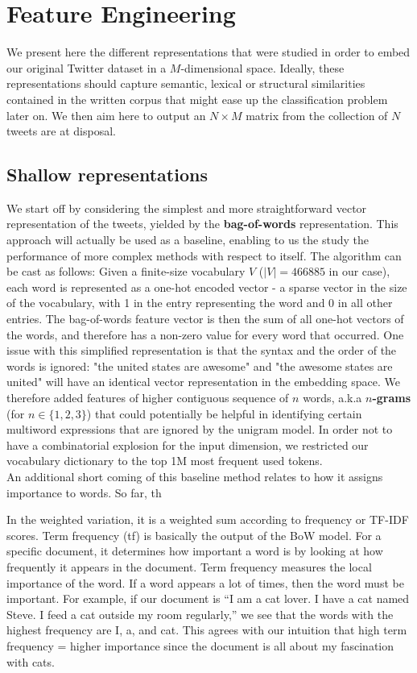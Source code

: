 \documentclass[10pt,conference,compsocconf,retainorgcmds]{IEEEtran}
\begin{document}
\section  {Feature Engineering}
We present here the different representations that were studied in order to embed our original Twitter dataset in a $M$-dimensional space. Ideally, these representations should capture semantic, lexical or structural similarities contained in the written corpus that might ease up the classification problem later on. We then aim here to output an $N\times M$ matrix from the collection of $N$ tweets are at disposal.

\subsection{Shallow representations}
We start off by considering the simplest and more straightforward vector representation of the tweets, yielded by the \textbf{bag-of-words} representation. This approach will actually be used as a baseline, enabling to us the study the performance of more complex methods with respect to itself. The algorithm can be cast as follows: Given a finite-size vocabulary $V$ ($|V|=466885$ in our case), each word is represented as a one-hot encoded vector - a sparse vector in the size of the vocabulary, with 1 in the entry representing the word and 0 in all other entries. The bag-of-words feature vector is then the sum of all one-hot vectors of the words, and therefore has a non-zero value for every word that occurred. One issue with this simplified representation is that the syntax and the order of the words is ignored: "the united states are awesome" and "the awesome states are united" will have an identical vector representation in the embedding space. We therefore added features of higher contiguous sequence of $n$ words, a.k.a \textbf{$n$-grams} (for $n\in \{1,2,3\}$) that could potentially be helpful in identifying certain multiword expressions that are ignored by the unigram model. In order not to have a combinatorial explosion for the input dimension, we restricted our vocabulary dictionary to the top 1M most frequent used tokens.\\
An additional short coming of this baseline method relates to how it assigns importance to words. So far,  th


In the weighted variation, it is a weighted sum according to frequency or TF-IDF scores.
Term frequency (tf) is basically the output of the BoW model. For a specific document, it determines how important a word is by looking at how frequently it appears in the document. Term frequency measures the local importance of the word. If a word appears a lot of times, then the word must be important. For example, if our document is  “I am a cat lover. I have a cat named Steve. I feed a cat outside my room regularly,” we see that the words with the highest frequency are I, a, and cat. This agrees with our intuition that high term frequency = higher importance since the document is all about my fascination with cats.
\end{document}
